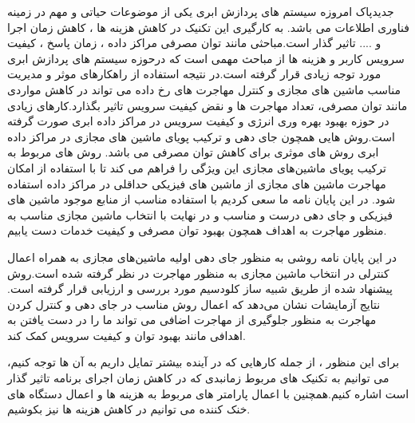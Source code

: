 ‌جدید‌پاک
امروزه سیستم های پردازش ابری یکی از موضوعات حیاتی و مهم در زمینه فناوری اطلاعات می باشد. به کارگیری این تکنیک در کاهش هزینه ها ، کاهش زمان اجرا و .... تاثیر گذار است.مباحثی مانند توان مصرفی مراکز داده ، زمان پاسخ ، کیفیت سرویس کاربر و هزینه  ها از مباحث مهمی است که درحوزه سیستم های پردازش ابری مورد توجه زیادی قرار گرفته است.در نتیجه استفاده از راهکارهای موثر و مدیریت مناسب ماشین های مجازی و کنترل مهاجرت های رخ داده می تواند در کاهش مواردی مانند توان مصرفی، تعداد مهاجرت ها و نقض کیفیت سرویس تاثیر بگذارد.کارهای زیادی در حوزه  بهبود بهره وری انرژی و کیفیت سرویس در مراکز داده ابری صورت گرفته است.روش هایی همچون جای دهی و ترکیب پویای ماشین های مجازی در مراکز داده ابری روش های موثری برای کاهش توان مصرفی می باشد. روش های مربوط به ترکیب پویای ماشین‌های مجازی این ویژگی را فراهم می کند تا با استفاده از امکان مهاجرت ماشین های مجازی از ماشین های فیزیکی حداقلی در مراکز داده استفاده شود. 
در این پایان نامه ما سعی کردیم با  استفاده مناسب از منابع موجود ماشین های فیزیکی و جای دهی درست و مناسب و در نهایت با انتخاب ماشین مجازی مناسب به منظور مهاجرت به اهداف همچون بهبود توان مصرفی و کیفیت خدمات دست یابیم. 

در این پایان نامه روشی به منظور جای دهی اولیه ماشین‌های مجازی به همراه اعمال کنترلی در انتخاب ماشین مجازی به منظور مهاجرت در نظر گرفته شده است.روش پیشنهاد شده از طریق شبیه ساز کلودسیم مورد بررسی و ارزیابی قرار گرفته است. نتایج آزمایشات نشان می‌دهد که اعمال روش مناسب در جای دهی و کنترل کردن مهاجرت به منظور جلوگیری از مهاجرت اضافی  می تواند ما را در دست یافتن به اهدافی مانند بهبود توان و کیفیت سرویس کمک کند.

برای این منظور ، از جمله کارهایی  که در آینده بیشتر  تمایل داریم به آن ها توجه کنیم، می توانیم به تکنیک های مربوط زمانبدی که در کاهش زمان اجرای برنامه تاثیر گذار است اشاره کنیم.همچنین با اعمال پارامتر های مربوط به هزینه ها و اعمال دستگاه های خنک کننده می توانیم در کاهش هزینه ها نیز بکوشیم. 
